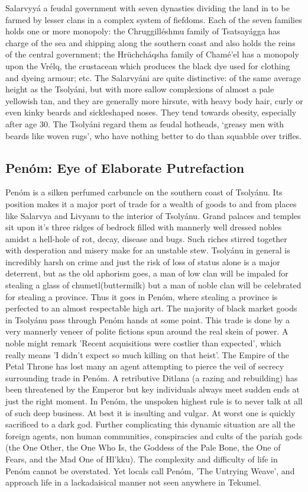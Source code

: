 Salarvyyá a feudal government with seven dynasties dividing the land in to be farmed by lesser clans in a complex system of fiefdoms. Each of the seven families holds one or more monopoly: the Chruggilléshmu family of Tsatsayágga has charge of the sea and shipping along the southern coast and also holds the reins of the central government; the Hrüchcháqsha family of Chamé’el has a monopoly upon the Vrélq, the crustacean which produces the black dye used for clothing and dyeing armour; etc. The Salarvyáni are quite distinctive: of the same average height as the Tsolyáni, but with more sallow complexions of almost a pale yellowish tan, and they are generally more hirsute, with heavy body hair, curly or even kinky beards and sickleshaped noses. They tend towards obesity, especially after age 30. The Tsolyáni regard them as feudal hotheads, ‘greasy men with beards like woven rugs’, who have nothing better to do than squabble over trifles.



\subsection{Penóm: Eye of Elaborate Putrefaction}

Penóm is a silken perfumed carbuncle on the southern coast of Tsolyánu. Its position makes it a  major port of trade for a wealth of goods to and from places like Salarvya and Livyanu to the interior of Tsolyánu. Grand palaces and temples sit upon it's three ridges of bedrock filled with mannerly well dressed nobles amidst a hell-hole of rot, decay, disease and bugs. Such riches stirred together with desperation and misery make for an unstable stew. Tsolyánu in general is incredibly harsh on crime and just the risk of loss of status alone is a major deterrent, but as the old aphorism goes, a man of low clan will be impaled for stealing a glass of chumetl(buttermilk) but a man of noble clan will be celebrated for stealing a province. Thus it goes in Penóm, where stealing a province is perfected to an almost respectable high art. The majority of black market goods in Tsolyánu pass through Penóm hands at some point. This trade is done by a very mannerly veneer of polite fictions spun around the real skein of power. A noble might remark 'Recent acquisitions were costlier than expected', which really means 'I didn't expect so much killing on that heist'. The Empire of the Petal Throne has lost many an agent attempting to pierce the veil of secrecy surrounding trade in Penóm. A retributive Ditlana (a razing and rebuilding) has been threatened by the Emperor but key individuals always meet sudden ends at just the right moment. In Penóm, the unspoken highest rule is to never talk at all of such deep business. At best it is insulting and vulgar. At worst one is quickly sacrificed to a dark god. Further complicating this dynamic situation are all the foreign agents, non human communities, conspiracies and cults of the pariah gods (the One Other, the One Who Is, the Goddess of the Pale Bone, the One of Fears, and the Mad One of Hl'kku). The complexity and difficulty of life in Penóm cannot be overstated. Yet locals call Penóm, 'The Untrying Weave', and approach life in a lackadaisical manner not seen anywhere in Tekumel.

